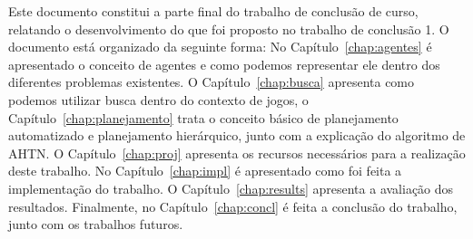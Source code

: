Este documento constitui a parte final do trabalho de conclusão de curso, relatando o desenvolvimento do que foi proposto no trabalho de conclusão 1. O documento está organizado da seguinte forma: No Capítulo~\ref{chap:agentes} é apresentado o conceito de agentes e como podemos representar ele dentro dos diferentes problemas existentes. O Capítulo~\ref{chap:busca} apresenta como podemos utilizar busca dentro do contexto de jogos, o Capítulo~\ref{chap:planejamento} trata o conceito básico de planejamento automatizado e planejamento hierárquico, junto com a explicação do algoritmo de AHTN. O Capítulo~\ref{chap:proj} apresenta os recursos necessários para a realização deste trabalho.
No Capítulo~\ref{chap:impl} é apresentado como foi feita a implementação do trabalho.
O Capítulo~\ref{chap:results} apresenta a avaliação dos resultados.
Finalmente, no Capítulo~\ref{chap:concl} é feita a conclusão do trabalho, junto com os trabalhos futuros.